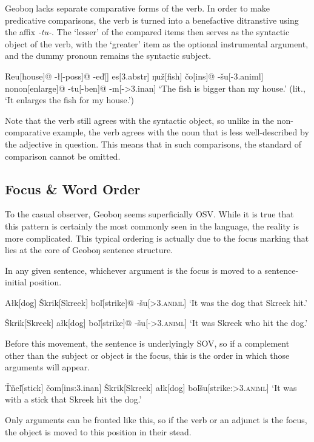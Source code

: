 \documentclass[10pt]{article}
\newcommand{\sk}{\textsc}
\newcommand{\vd}{ď}
\newcommand{\vc}{č}
\newcommand{\vz}{ž}
\newcommand{\vs}{š}
\newcommand{\vl}{ľ}
\newcommand{\vn}{ň}
\newcommand{\vT}{Ť}
\newcommand{\vS}{Š}
\newcommand{\engma}{ŋ}
\begin{document}
Geobo{\engma} lacks separate comparative forms of the verb. In order to make predicative comparisons, the verb is turned into a benefactive ditranstive using the affix \textit{-tu-}. The `lesser' of the compared items then serves as the syntactic object of the verb, with the `greater' item as the optional instrumental argument, and the dummy pronoun remains the syntactic subject.

\ex 
\begingl
Reu[house]@
-\l[\sc -poss]@
-e\vd[]
es[\sc 3.abstr]
\engma u\vz[fish] 
\vc o[\sc ins]@
-\vs u[\sc -3.animl]
nonon[enlarge]@
-tu[\sc -ben]@
-m[\sc ->3.inan]
\glft `The fish is bigger than my house.' (lit., `It enlarges the fish for my house.')
\endgl
\xe

Note that the verb still agrees with the syntactic object, so unlike in the non-comparative example, the verb agrees with the noun that is less well-described by the adjective in question. This means that in such comparisons, the standard of comparison cannot be omitted.

\subsection{Focus \& Word Order}\label{focus}

To the casual observer, Geobo{\engma} seems superficially OSV. While it is true that this pattern is certainly the most commonly seen in the language, the reality is more complicated. This typical ordering is actually due to the focus marking that lies at the core of Geobo{\engma} sentence structure.

In any given sentence, whichever argument is the focus is moved to a sentence-initial position. 

\ex
\begingl
A\l k[dog]
\vS krik[Skreek]
bo\vl[strike]@
-\vs u[\sk{>3.animl}]
\glft `It was the dog that Skreek hit.'
\endgl
\xe

\ex
\begingl
\vS krik[Skreek]
a\l k[dog]
bo\vl[strike]@
-\vs u[-\sk{>3.animl}]
\glft `It was Skreek who hit the dog.'
\endgl
\xe

Before this movement, the sentence is underlyingly SOV, so if a complement other than the subject or object is the focus, this is the order in which those arguments will appear.

\ex
\begingl
\vT\vn e{\vl}[stick]
\vc om[\sc ins:3.inan]
\vS krik[Skreek]
a\l k[dog]
bo\vl\vs u[strike:\sk{>3.animl}]
\glft `It was with a stick that Skreek hit the dog.'
\endgl
\xe

Only arguments can be fronted like this, so if the verb or an adjunct is the focus, the object is moved to this position in their stead. 
\end{document}
